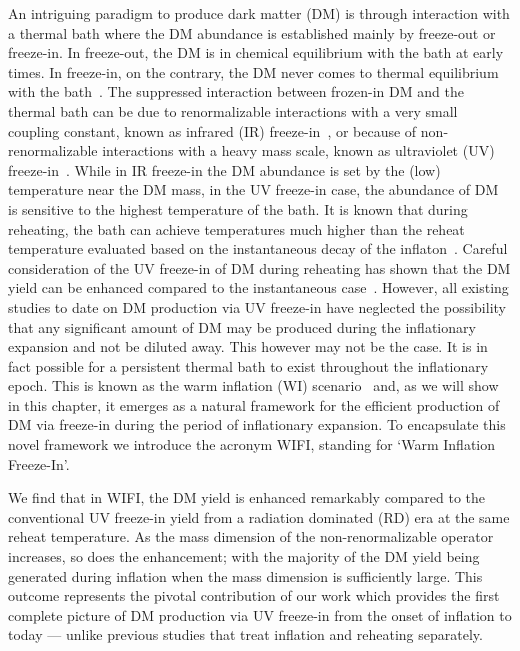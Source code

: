 An intriguing paradigm to produce dark matter (DM) is through interaction with a thermal bath where the DM abundance is established mainly by freeze-out or freeze-in. In freeze-out, the DM is in chemical equilibrium with the bath at early times. In  freeze-in, on the contrary, the DM never comes to thermal equilibrium with the bath~\cite{Hall:2009bx}. The suppressed interaction between frozen-in DM and the thermal bath can be due to renormalizable interactions with a very small coupling constant, known as infrared (IR) freeze-in~\cite{Hall:2009bx}, or because of non-renormalizable interactions with a heavy mass scale, known as ultraviolet (UV) freeze-in~\cite{Elahi:2014fsa}. While in IR freeze-in the DM abundance is set by the (low) temperature near the DM mass, in the UV freeze-in case, the abundance of DM is sensitive to the highest temperature of the bath. It is known that during reheating, the bath can achieve temperatures much higher than the reheat temperature evaluated based on the instantaneous decay of the inflaton~\cite{Chung:1998rq,Giudice:2000ex,Kolb:2003ke}. Careful consideration of the UV freeze-in of DM during reheating has shown that the DM yield can be enhanced compared to the instantaneous case~\cite{Garcia:2017tuj,Chen:2017kvz,Bernal:2019mhf,Barman:2022tzk,Garcia:2018wtq,Chowdhury:2023jft}. However, all existing studies to date on DM production via UV freeze-in have neglected the possibility that any significant amount of DM may be produced during the inflationary expansion and not be diluted away.
This however may not be the case. It is in fact possible for a persistent thermal bath  to exist throughout the inflationary epoch. This is known as the warm inflation (WI) scenario~\cite{Berera:1995ie, Berera:1995wh, Berera:1998px} and, as we will show in this chapter, it emerges as a natural framework for the efficient production of DM via freeze-in during the period of inflationary expansion. To encapsulate this novel framework we introduce the acronym WIFI, standing for `Warm Inflation  Freeze-In'.

We find that in WIFI, the DM yield is enhanced remarkably
compared to the conventional UV freeze-in yield from
a radiation dominated (RD) era at the same reheat temperature. As the mass dimension of the non-renormalizable operator increases, so does the enhancement; with the majority of the DM yield being generated during inflation when the mass dimension is sufficiently large. This outcome represents the pivotal contribution of our work which  provides the first complete picture of DM production via UV
freeze-in from the onset of inflation to today --- unlike previous studies that treat inflation and reheating separately.



